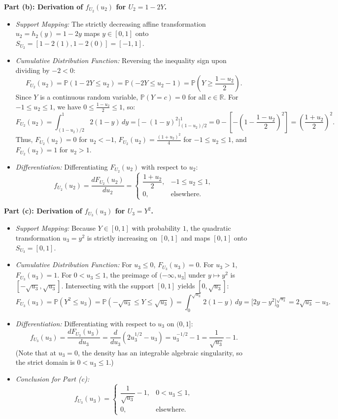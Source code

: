 \documentclass[11pt, letterpaper]{article}
\theoremstyle{definition}
\theoremstyle{remark}
\newcommand{\R}{\mathbb{R}}
\newcommand{\Prob}{\mathbb{P}}
\begin{document}
\textbf{Part (b): Derivation of $f_{U_2}(u_2)$ for $U_2 = 1 - 2Y$.}
\begin{itemize}
    \item \textit{Support Mapping:} The strictly decreasing affine transformation $u_2 = h_2(y) = 1 - 2y$ maps $y \in [0, 1]$ onto $S_{U_2} = [1 - 2(1), 1 - 2(0)] = [-1, 1]$.
    \item \textit{Cumulative Distribution Function:} Reversing the inequality sign upon dividing by $-2 < 0$:
    \[
        F_{U_2}(u_2) = \Prob(1 - 2Y \le u_2) = \Prob(-2Y \le u_2 - 1) = \Prob\left(Y \ge \frac{1 - u_2}{2}\right).
    \]
    Since $Y$ is a continuous random variable, $\Prob(Y = c) = 0$ for all $c \in \R$. For $-1 \le u_2 \le 1$, we have $0 \le \frac{1 - u_2}{2} \le 1$, so:
    \[
        F_{U_2}(u_2) = \int_{(1 - u_2)/2}^{1} 2(1 - y)\,dy = \Big[ -(1 - y)^2 \Big]_{(1 - u_2)/2}^{1} = 0 - \left[ -\left(1 - \frac{1 - u_2}{2}\right)^2 \right] = \left(\frac{1 + u_2}{2}\right)^2.
    \]
    Thus, $F_{U_2}(u_2) = 0$ for $u_2 < -1$, $F_{U_2}(u_2) = \frac{(1+u_2)^2}{4}$ for $-1 \le u_2 \le 1$, and $F_{U_2}(u_2) = 1$ for $u_2 > 1$.
    \item \textit{Differentiation:} Differentiating $F_{U_2}(u_2)$ with respect to $u_2$:
    \[
        f_{U_2}(u_2) = \frac{dF_{U_2}(u_2)}{du_2} = \begin{cases} \dfrac{1 + u_2}{2}, & -1 \le u_2 \le 1, \\[6pt] 0, & \text{elsewhere.} \end{cases}
    \]
\end{itemize}

\textbf{Part (c): Derivation of $f_{U_3}(u_3)$ for $U_3 = Y^2$.}
\begin{itemize}
    \item \textit{Support Mapping:} Because $Y \in [0, 1]$ with probability $1$, the quadratic transformation $u_3 = y^2$ is strictly increasing on $[0, 1]$ and maps $[0, 1]$ onto $S_{U_3} = [0, 1]$.
    \item \textit{Cumulative Distribution Function:} For $u_3 \le 0$, $F_{U_3}(u_3) = 0$. For $u_3 > 1$, $F_{U_3}(u_3) = 1$. For $0 < u_3 \le 1$, the preimage of $(-\infty, u_3]$ under $y \mapsto y^2$ is $[-\sqrt{u_3}, \sqrt{u_3}]$. Intersecting with the support $[0, 1]$ yields $[0, \sqrt{u_3}]$:
    \[
        F_{U_3}(u_3) = \Prob(Y^2 \le u_3) = \Prob(-\sqrt{u_3} \le Y \le \sqrt{u_3}) = \int_{0}^{\sqrt{u_3}} 2(1 - y)\,dy = \Big[ 2y - y^2 \Big]_{0}^{\sqrt{u_3}} = 2\sqrt{u_3} - u_3.
    \]
    \item \textit{Differentiation:} Differentiating with respect to $u_3$ on $(0, 1]$:
    \[
        f_{U_3}(u_3) = \frac{dF_{U_3}(u_3)}{du_3} = \frac{d}{du_3}\left(2u_3^{1/2} - u_3\right) = u_3^{-1/2} - 1 = \frac{1}{\sqrt{u_3}} - 1.
    \]
    (Note that at $u_3 = 0$, the density has an integrable algebraic singularity, so the strict domain is $0 < u_3 \le 1$.)
    \item \textit{Conclusion for Part (c):}
    \[
        f_{U_3}(u_3) = \begin{cases} \dfrac{1}{\sqrt{u_3}} - 1, & 0 < u_3 \le 1, \\[6pt] 0, & \text{elsewhere.} \end{cases}
    \]
\end{itemize}
\end{document}
